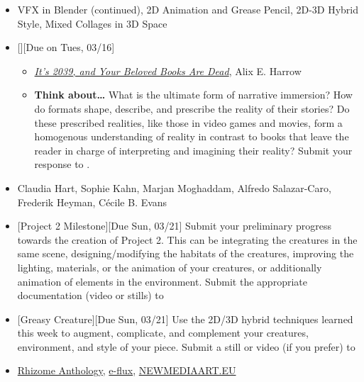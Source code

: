 \def\dMon{Mon, 03/15}
\def\dTues{Tues, 03/16}
\def\dWed{Wed, 03/17}
\def\dThur{Thur, 03/18}
\def\dFri{Fri, 03/19}
\def\dSat{Sat, 03/20}
\def\dSun{Sun, 03/21}
\placeDate

\begin{itemize}[noitemsep,topsep=0pt,leftmargin=*]
    \item {} VFX in Blender (continued), 2D Animation and Grease Pencil, 2D-3D Hybrid Style, Mixed Collages in 3D Space
    \item {}[][Due on \dTues]
    \begin{itemize}
        \item \href{https://www.nytimes.com/2019/12/02/opinion/future-virtual-reality-stories.html}{\emph{It’s 2039, and Your Beloved Books Are Dead}}, Alix E. Harrow
        \item \textbf{Think about\dots} What is the ultimate form of narrative immersion? How do formats shape, describe, and prescribe the reality of their stories? Do these prescribed realities, like those in video games and movies, form a homogenous understanding of reality in contrast to books that leave the reader in charge of interpreting and imagining their reality? Submit your response to \discordR.
    \end{itemize}
    \item {} Claudia Hart, Sophie Kahn, Marjan Moghaddam, Alfredo Salazar-Caro, Frederik Heyman, Cécile B. Evans
    \item {}[Project 2 Milestone][Due \dSun] Submit your preliminary progress towards the creation of Project 2. This can be integrating the creatures in the same scene, designing/modifying the habitats of the creatures, improving the lighting, materials, or the animation of your creatures, or additionally animation of elements in the environment. Submit the appropriate documentation (video or stills) to \discordE
    \item {}[Greasy Creature][Due \dSun] Use the 2D/3D hybrid techniques learned this week to augment, complicate, and complement your creatures, environment, and style of your piece. Submit a still or video (if you prefer) to \discordC
    \item {} \href{https://anthology.rhizome.org/}{Rhizome Anthology}, \href{https://www.e-flux.com/journal/}{e-flux}, \href{https://www.newmediaart.eu/}{NEWMEDIAART.EU}
\end{itemize}